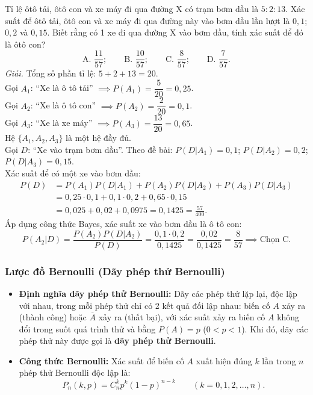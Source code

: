 \begin{vidu}
Tỉ lệ ôtô tải, ôtô con và xe máy đi qua đường X có trạm bơm dầu là $5 : 2 : 13$. Xác suất để ôtô tải, ôtô con và xe máy đi qua đường này vào bơm dầu lần lượt là $0{,}1$; $0{,}2$ và $0{,}15$. Biết rằng có 1 xe đi qua đường X vào bơm dầu, tính xác suất để đó là ôtô con?\\
\[
\text{A. } \frac{11}{57}; \qquad \text{B. } \frac{10}{57}; \qquad \text{C. } \frac{8}{57}; \qquad \text{D. } \frac{7}{57}.
\]
\textit{Giải.} 
Tổng số phần tỉ lệ: $5 + 2 + 13 = 20$.\\
Gọi $A_1$: ``Xe là ô tô tải'' $\implies P(A_1) = \dfrac{5}{20} = 0{,}25$.\\
Gọi $A_2$: ``Xe là ô tô con'' $\implies P(A_2) = \dfrac{2}{20} = 0{,}1$.\\
Gọi $A_3$: ``Xe là xe máy'' $\implies P(A_3) = \dfrac{13}{20} = 0{,}65$.\\
Hệ $\{A_1, A_2, A_3\}$ là một hệ đầy đủ.\\
Gọi $D$: ``Xe vào trạm bơm dầu''. Theo đề bài:
$P(D|A_1) = 0{,}1$; $P(D|A_2) = 0{,}2$; $P(D|A_3) = 0{,}15$.\\
Xác suất để có một xe vào bơm dầu:
\begin{align*}
P(D) &= P(A_1)P(D|A_1) + P(A_2)P(D|A_2) + P(A_3)P(D|A_3) \\
     &= 0{,}25 \cdot 0{,}1 + 0{,}1 \cdot 0{,}2 + 0{,}65 \cdot 0{,}15 \\
     &= 0{,}025 + 0{,}02 + 0{,}0975 = 0{,}1425 = \frac{57}{400}.
\end{align*}
Áp dụng công thức Bayes, xác suất xe vào bơm dầu là ô tô con:
\[
P(A_2|D) = \frac{P(A_2)P(D|A_2)}{P(D)} = \frac{0{,}1 \cdot 0{,}2}{0{,}1425} = \frac{0{,}02}{0{,}1425} = \frac{8}{57} \implies \text{Chọn C.}
\]
\end{vidu}

\subsubsection{Lược đồ Bernoulli (Dãy phép thử Bernoulli)}
\begin{itemize}[leftmargin=1.5em]
    \item \textbf{Định nghĩa dãy phép thử Bernoulli:}
    Dãy các phép thử lặp lại, độc lập với nhau, trong mỗi phép thử chỉ có 2 kết quả đối lập nhau: biến cố $A$ xảy ra (thành công) hoặc $\overline{A}$ xảy ra (thất bại), với xác suất xảy ra biến cố $A$ không đổi trong suốt quá trình thử và bằng $P(A) = p$ ($0 < p < 1$). Khi đó, dãy các phép thử này được gọi là \textbf{dãy phép thử Bernoulli}.
    \item \textbf{Công thức Bernoulli:}
    Xác suất để biến cố $A$ xuất hiện đúng $k$ lần trong $n$ phép thử Bernoulli độc lập là:
    \[
    P_n(k, p) = C_n^k p^k (1 - p)^{n - k} \qquad (k = 0, 1, 2, \dots, n).
    \]
\end{itemize}

